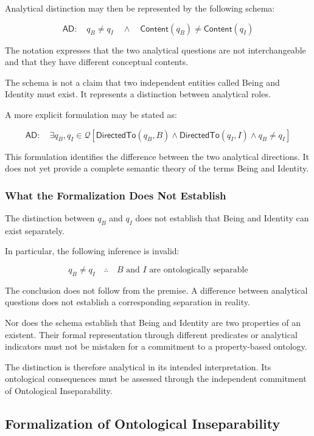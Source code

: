 Analytical distinction may then be represented by the
following schema:

\[
\mathsf{AD}:
\quad
q_B \neq q_I
\quad \land \quad
\mathsf{Content}(q_B)
\neq
\mathsf{Content}(q_I)
\]

The notation expresses that the two analytical questions
are not interchangeable and that they have different
conceptual contents.

The schema is not a claim that two independent entities
called Being and Identity must exist. It represents
a distinction between analytical roles.

A more explicit formulation may be stated as:

\[
\mathsf{AD}:
\quad
\exists q_B,q_I \in \mathcal{Q}
\left[
\mathsf{DirectedTo}(q_B,B)
\land
\mathsf{DirectedTo}(q_I,I)
\land
q_B \neq q_I
\right]
\]

This formulation identifies the difference between
the two analytical directions. It does not yet
provide a complete semantic theory of the terms
Being and Identity.

\subsubsection{What the Formalization Does Not Establish}

The distinction between \(q_B\) and \(q_I\) does not
establish that Being and Identity can exist separately.

In particular, the following inference is invalid:

\[
q_B \neq q_I
\quad \therefore \quad
B \text{ and } I
\text{ are ontologically separable}
\]

The conclusion does not follow from the premise.
A difference between analytical questions does not
establish a corresponding separation in reality.

Nor does the schema establish that Being and Identity
are two properties of an existent. Their formal
representation through different predicates or
analytical indicators must not be mistaken for
a commitment to a property-based ontology.

The distinction is therefore analytical in its
intended interpretation. Its ontological consequences
must be assessed through the independent commitment
of Ontological Inseparability.

\subsection{Formalization of Ontological Inseparability}

